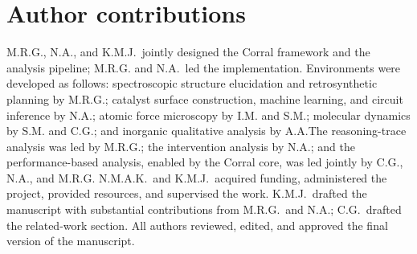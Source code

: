 \section*{Author contributions}
\footnotesize
\insertcredits
\normalsize

\noindent M.R.G., N.A., and K.M.J.\ jointly designed the Corral framework and the analysis pipeline; M.R.G. and N.A.\ led the implementation. Environments were developed as follows: spectroscopic structure elucidation and retrosynthetic planning by M.R.G.; catalyst surface construction, machine learning, and circuit inference by N.A.; atomic force microscopy by I.M. and S.M.; molecular dynamics by S.M. and C.G.; and inorganic qualitative analysis by A.A.\@ The reasoning-trace analysis was led by M.R.G.; the intervention analysis by N.A.; and the performance-based analysis, enabled by the Corral core, was led jointly by C.G., N.A., and M.R.G.\@ 
N.M.A.K.\ and K.M.J.\ acquired funding, administered the project, provided resources, and supervised the work. K.M.J.\ drafted the manuscript with substantial contributions from M.R.G.\ and N.A.; C.G.\ drafted the related-work section. All authors reviewed, edited, and approved the final version of the manuscript.

